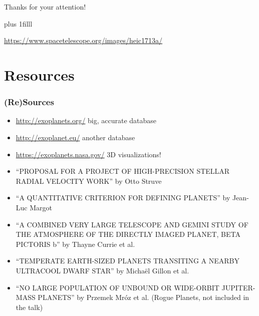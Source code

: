\documentclass[presentation,t,aspectratio=169]{beamer}
\newcommand{\btVFill}{\vskip0pt plus 1filll}
\begin{document}
{
  \begin{frame}[plain]
    \bigskip
    \hfill  \color{white} Thanks for your attention!

    \btVFill
    
    \hfill\tiny\color{white}\url{https://www.spacetelescope.org/images/heic1713a/}\bigskip
  \end{frame}
}

\section*{Resources}
\begin{frame}
  \frametitle{(Re)Sources}
  \begin{itemize}
  \item \scriptsize \url{http://exoplanets.org/} big, accurate database \normalsize
  \item \scriptsize \url{http://exoplanet.eu/} another database \normalsize
  \item \scriptsize \url{https://exoplanets.nasa.gov/} 3D visualizations! \normalsize
  \item \tiny{``PROPOSAL FOR A PROJECT OF HIGH-PRECISION STELLAR RADIAL VELOCITY WORK''} by Otto Struve \normalsize
  \item \tiny{``A QUANTITATIVE CRITERION FOR DEFINING PLANETS''}  by Jean-Luc Margot \normalsize
  \item \tiny{``A COMBINED VERY LARGE TELESCOPE AND GEMINI STUDY OF THE ATMOSPHERE
      OF THE DIRECTLY IMAGED PLANET, BETA PICTORIS b''} by Thayne Currie et al. \normalsize
  \item \tiny{``TEMPERATE EARTH-SIZED PLANETS TRANSITING A NEARBY
      ULTRACOOL DWARF STAR''} by
    Michaël Gillon  et al. \normalsize
  \item \tiny{``NO LARGE POPULATION OF UNBOUND OR WIDE-ORBIT
      JUPITER-MASS PLANETS''} by Przemek Mróz et al. (Rogue Planets, not included in the talk) \normalsize 

  \end{itemize}
\end{frame}
\end{document}

